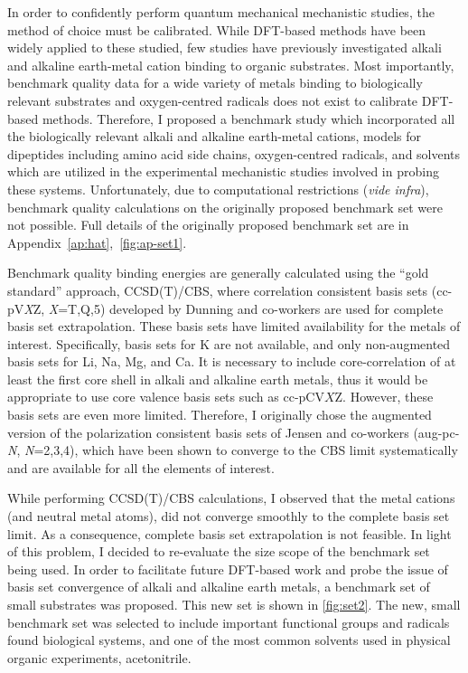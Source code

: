In order to confidently perform quantum mechanical mechanistic studies, the method of choice must be calibrated. While DFT-based methods have been widely applied to these studied, few studies have previously investigated alkali and alkaline earth-metal cation binding to organic substrates.\cite{Corral2003, Suarez2011, Siu2001, Baldauf2013} Most importantly, benchmark quality data for a wide variety of metals binding to biologically relevant substrates and oxygen-centred radicals does not exist to calibrate DFT-based methods. Therefore, I proposed a benchmark study which incorporated all the biologically relevant alkali and alkaline earth-metal cations, models for dipeptides including amino acid side chains, oxygen-centred radicals, and solvents which are utilized in the experimental mechanistic studies involved in probing these systems. Unfortunately, due to computational restrictions (\emph{vide infra}), benchmark quality calculations on the originally proposed benchmark set were not possible. Full details of the originally proposed benchmark set are in Appendix~\ref{ap:hat},~\ref{fig:ap-set1}.

Benchmark quality binding energies are generally calculated using the ``gold standard'' approach, CCSD(T)/CBS, where correlation consistent basis sets\cite{Marshall2011, Rezac2013} (cc-pV\emph{X}Z, \emph{X}=T,Q,5) developed by Dunning and\cite{Vydrov2006, Vydrov2006a} co-workers are used for complete basis set extrapolation. These basis sets have limited availability for the metals of interest. Specifically, basis sets for K are not available, and only non-augmented basis sets for Li, Na, Mg, and Ca. It is necessary to include core-correlation of at least the first core shell in alkali and alkaline earth metals, thus it would be appropriate to use core valence basis sets such as cc-pCV$X$Z.\cite{Peterson2002} However, these basis sets are even more limited. Therefore, I originally chose the augmented version of the polarization consistent basis sets of Jensen and co-workers\cite{Jensen2001, Jensen2002, Jensen2002a, Jensen2003}  (aug-pc-\emph{N}, \emph{N}=2,3,4), which have been shown to converge to the CBS limit systematically\cite{Kupka2007} and are available for all the elements of interest.

While performing CCSD(T)/CBS calculations, I observed that the metal cations (and neutral metal atoms), did not converge smoothly to the complete basis set limit. As a consequence, complete basis set extrapolation is not feasible. In light of this problem, I decided to re-evaluate the size scope of the benchmark set being used. In order to facilitate future DFT-based work and probe the issue of basis set convergence of alkali and alkaline earth metals, a benchmark set of small substrates was proposed. This new set is shown in \ref{fig:set2}. The new, small benchmark set was selected to include important functional groups and radicals found biological systems, and one of the most common solvents used in physical organic experiments, acetonitrile.


